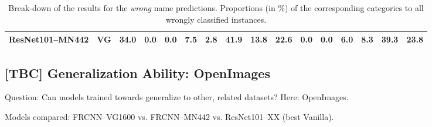 \begin{table}[t]
\begin{tabular}{ll|r@{~}|r@{~}r@{~}r@{~}r@{~}|r@{~}r@{~}||r@{~}|r@{~}r@{~}r@{~}r@{~}|r@{~}r@{~}}
	ResNet101--MN442 & VG &                 34.0 &             0.0 &                 0.0 &                   7.5 &            2.8 &           41.9 &             13.8 &                 22.6 &             0.0 &                 0.0 &                   6.0 &            8.3 &           39.3 &             23.8 \\
	\bottomrule
\end{tabular}
\caption{Break-down of the results for the \textit{wrong} name predictions. Proportions (in \%) of the corresponding categories to all wrongly classified instances.  \label{tab:exp_details_wrong}}
\end{table}

\fi


\subsection{[TBC] Generalization Ability: OpenImages}
\label{sect:exp_openimages}
Question: Can models trained towards \mn generalize to other, related datasets? Here: OpenImages. \

Models compared: FRCNN--VG1600 vs. FRCNN--MN442 vs. ResNet101--XX (best Vanilla).
